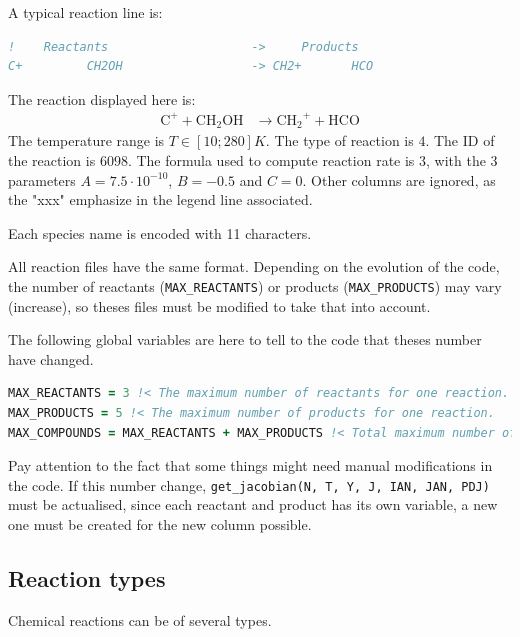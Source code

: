 \documentclass[english,a4paper,twoside]{article}
\begin{document}
A typical reaction line is:
\begin{lstlisting}[language=Fortran]
!    Reactants                    ->     Products                                                A          B          C      xxxxxxxxxxxxxxxxxxxxx ITYPE Tmin   Tmax formula ID xxxxx
C+         CH2OH                  -> CH2+       HCO                                           7.500E-10 -5.000E-01  0.000E+00 0.00e+00 0.00e+00   NA  4     10    280  3  6098 1  1
\end{lstlisting}
The reaction displayed here is:
\begin{align*}
\mathrm{C^+} + \mathrm{CH_2OH} &\rightarrow \mathrm{CH_2}^+ + \mathrm{HCO}
\end{align*}
The temperature range is $T\in[10;280]\unit{K}$. The type of reaction is $4$. The ID of the reaction is $6098$. The formula used to compute reaction rate is $3$, with the 3 parameters $A=7.5\cdot 10^{-10}$, $B=-0.5$ and $C=0$. Other columns are ignored, as the "xxx" emphasize in the legend line associated.

\bigskip

Each species name is encoded with 11 characters.

All reaction files have the same format. Depending on the evolution of the code, the number of reactants (\verb|MAX_REACTANTS|) or products (\verb|MAX_PRODUCTS|) may vary (increase), so theses files must be modified to take that into account. 

The following global variables are here to tell to the code that theses number have changed. 
\begin{lstlisting}[language=Fortran]
MAX_REACTANTS = 3 !< The maximum number of reactants for one reaction.
MAX_PRODUCTS = 5 !< The maximum number of products for one reaction.
MAX_COMPOUNDS = MAX_REACTANTS + MAX_PRODUCTS !< Total maximum number of compounds for one reaction (reactants + products)
\end{lstlisting}

\begin{attention}
Pay attention to the fact that some things might need manual modifications in the code. If this number change, \verb|get_jacobian(N, T, Y, J, IAN, JAN, PDJ)| must be actualised, since each reactant and product has its own variable, a new one must be created for the new column possible. 
\end{attention}

\subsection{Reaction types}
Chemical reactions can be of several types. 
\end{document}
